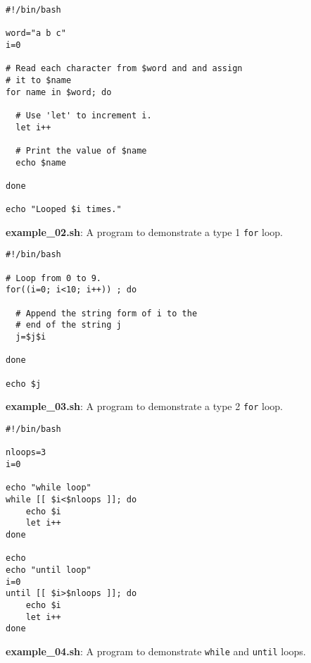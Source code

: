 \documentclass[17pt,dvips]{foils}
\begin{document}

\begin{verbatim}
#!/bin/bash

word="a b c"
i=0
 
# Read each character from $word and and assign
# it to $name
for name in $word; do
 
  # Use 'let' to increment i.
  let i++
 
  # Print the value of $name
  echo $name
 
done
 
echo "Looped $i times."
\end{verbatim}
{\bf example\_02.sh}: A program to demonstrate a type 1 \texttt{for} loop.
%


\begin{verbatim}
#!/bin/bash
 
# Loop from 0 to 9.
for((i=0; i<10; i++)) ; do
 
  # Append the string form of i to the
  # end of the string j
  j=$j$i
 
done
 
echo $j
\end{verbatim}
{\bf example\_03.sh}: A program to demonstrate a type 2 \texttt{for} loop.


\begin{verbatim}
#!/bin/bash

nloops=3
i=0
 
echo "while loop"
while [[ $i<$nloops ]]; do
    echo $i
    let i++
done
 
echo
echo "until loop"
i=0
until [[ $i>$nloops ]]; do
    echo $i
    let i++
done
\end{verbatim}
{\bf example\_04.sh}: A program to demonstrate \texttt{while} and 
\texttt{until} loops.
\end{document}
